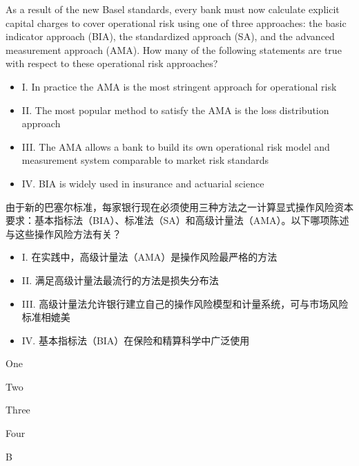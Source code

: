 \documentclass{article}
\newcounter{question} %
\begin{document}
\begin{question}
    As a result of the new Basel standards, every bank must now calculate explicit capital charges to cover operational risk using one of three approaches: the basic indicator approach (BIA), the standardized approach (SA), and the advanced measurement approach (AMA). How many of the following statements are true with respect to these operational risk approaches?
    \begin{itemize}
        \item I. In practice the AMA is the most stringent approach for operational risk
        \item II. The most popular method to satisfy the AMA is the loss distribution approach
        \item III. The AMA allows a bank to build its own operational risk model and measurement system comparable to market risk standards
        \item IV. BIA is widely used in insurance and actuarial science
    \end{itemize}
    由于新的巴塞尔标准，每家银行现在必须使用三种方法之一计算显式操作风险资本要求：基本指标法（BIA）、标准法（SA）和高级计量法（AMA）。以下哪项陈述与这些操作风险方法有关？
    \begin{itemize}
        \item I. 在实践中，高级计量法（AMA）是操作风险最严格的方法
        \item II. 满足高级计量法最流行的方法是损失分布法
        \item III. 高级计量法允许银行建立自己的操作风险模型和计量系统，可与市场风险标准相媲美
        \item IV. 基本指标法（BIA）在保险和精算科学中广泛使用
    \end{itemize}
\end{question}

\begin{choices}
    \item One
    \item Two
    \item Three
    \item Four
\end{choices}

\begin{correctanswer}
    B
\end{correctanswer}
\end{document}
